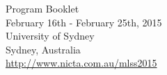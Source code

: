 \documentclass[12pt]{article}
\begin{document}
\vspace{5cm}

\begin{center}
{\Large Program Booklet} \\[0.3cm]
        February 16th - February 25th, 2015 \\
       University of Sydney\\
      Sydney, Australia\\
       \url{http://www.nicta.com.au/mlss2015}
\end{center}

\clearpage
\thispagestyle{empty}
~\clearpage

\tableofcontents


\pagestyle{fancy}

\clearpage
\label{preface}



\clearpage
\label{intro}


\clearpage
 \label{techprg}
 

\clearpage
\label{speakers}


 
\clearpage
\label{organizers}

% 
 \clearpage
 \label{instructions}
 
\end{document}
